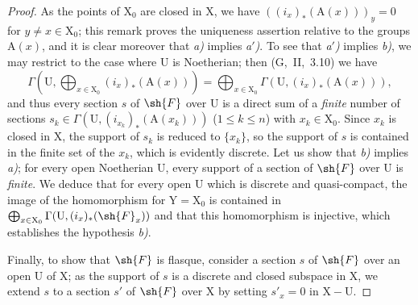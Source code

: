 \begin{proof}
As the points of $\mathrm{X}_0$ are closed in $\mathrm{X}$, we have $((i_x)_*(\mathrm{A}(x)))_y=0$ for $y\neq x\in\mathrm{X}_0$;
this remark proves the uniqueness assertion relative to the groups $\mathrm{A}(x)$, and it is clear moreover that \emph{a)} implies \emph{a$'$)}.
To see that \emph{a$'$)} implies \emph{b)}, we may restrict to the case where $\mathrm{U}$ is Noetherian;
then (G,~II,~3.10) we have
\[
  \Gamma(\mathrm{U},\bigoplus_{x\in\mathrm{X}_0}(i_x)_*(\mathrm{A}(x)))=\bigoplus_{x\in\mathrm{X}_0}\Gamma(\mathrm{U},(i_x)_*(\mathrm{A}(x))),
\]
and thus every section $s$ of $\sh{F}$ over $\mathrm{U}$ is a direct sum of a \emph{finite} number of sections $s_k\in\Gamma(\mathrm{U},(i_{x_k})_*(\mathrm{A}(x_k)))$ ($1\leq k\leq n$) with $x_k\in\mathrm{X}_0$.
Since $x_k$ is closed in $\mathrm{X}$, the support of $s_k$ is reduced to $\{x_k\}$, so the support of $s$ is contained in the finite set of the $x_k$, which is evidently discrete.
Let us show that \emph{b)} implies \emph{a)};
for every open Noetherian $\mathrm{U}$, every support of a section of $\sh{F}$ over $\mathrm{U}$ is \emph{finite}.
We deduce that for every open $\mathrm{U}$ which is discrete and quasi-compact, the image of the homomorphism  for $\mathrm{Y}=\mathrm{X}_0$ is contained in $\bigoplus_{x\in\mathrm{X}_0}\Gamma(\mathrm{U},(i_x)_*(\sh{F}_x))$ and that this homomorphism is injective, which establishes the hypothesis \emph{b)}.

Finally, to show that $\sh{F}$ is flasque, consider a section $s$ of $\sh{F}$ over an open $\mathrm{U}$ of $\mathrm{X}$;
as the support of $s$ is a discrete and closed subspace in $\mathrm{X}$, we extend $s$ to a section $s'$ of $\sh{F}$ over $\mathrm{X}$ by setting $s'_x=0$ in $\mathrm{X}-\mathrm{U}$.
\end{proof}

